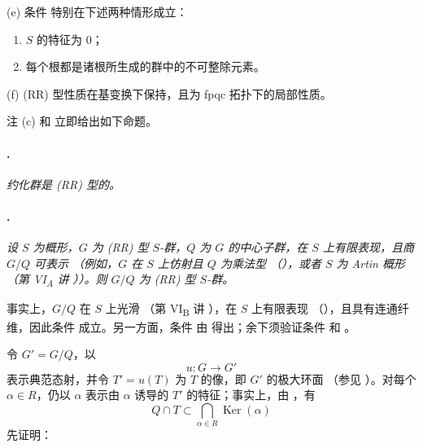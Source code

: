 \textup{(e)} 条件 \textup{} 特别在下述两种情形成立：
\begin{enumerate}
\item[\textup{(1)}]
\(S\) 的特征为 \(0\)；

\item[\textup{(2)}]
每个根都是诸根所生成的群中的不可整除元素。
\end{enumerate}

\textup{(f)} \textup{(RR)} 型性质在基变换下保持，且为 fpqc 拓扑下的局部性质。

注 \textup{(c)} 和 \textup{} 立即给出如下命题。

\paragraph{.}
\textit{约化群是 \textup{(RR)} 型的。}

\paragraph{.}
\textit{设 \(S\) 为概形，\(G\) 为 \textup{(RR)} 型 \(S\)-群，\(Q\) 为 \(G\) 的中心子群，在 \(S\) 上有限表现，且商 \(G/Q\) 可表示 \textup{（例如，\(G\) 在 \(S\) 上仿射且 \(Q\) 为乘法型 \textup{（）}，或者 \(S\) 为 Artin 概形 \textup{（第 VI\textsubscript{A} 讲 ）}）}。则 \(G/Q\) 为 \textup{(RR)} 型 \(S\)-群。}

事实上，\(G/Q\) 在 \(S\) 上光滑 \textup{（第 VI\textsubscript{B} 讲 ）}，在 \(S\) 上有限表现 \textup{（）}，且具有连通纤维，因此条件 \textup{} 成立。另一方面，条件 \textup{} 由 得出；余下须验证条件 \textup{} 和 \textup{}。

令 \(G'=G/Q\)，以
\[
  u:G\longrightarrow G'
\]
表示典范态射，并令 \(T'=u(T)\) 为 \(T\) 的像，即 \(G'\) 的极大环面 \textup{（参见 \textup{}）}。对每个 \(\alpha\in R\)，仍以 \(\alpha\) 表示由 \(\alpha\) 诱导的 \(T'\) 的特征；事实上，由  \textup{}，有
\[
  Q\cap T
  \subset
  \bigcap_{\alpha\in R}\operatorname{Ker}(\alpha)
\]
先证明：

